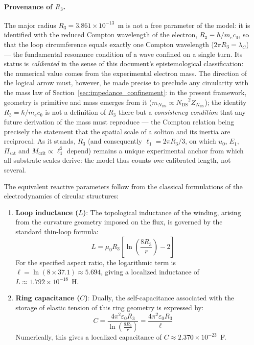 \documentclass[11pt,a4paper]{article}
\theoremstyle{plain}
\theoremstyle{remark}
\newcommand{\Ncd}{\ensuremath{N_{\mathrm{DS}}}}
\begin{document}
\paragraph{Provenance of $R_3$.}
The major radius $R_3 = 3.861\times10^{-13}$~m is not a free parameter of the model: it is identified with the reduced Compton wavelength of the electron, $R_3 \equiv \hbar/m_e c_0$, so that the loop circumference equals exactly one Compton wavelength ($2\pi R_3 = \lambda_C$) --- the fundamental resonance condition of a wave confined on a single turn. Its status is \emph{calibrated} in the sense of this document's epistemological classification: the numerical value comes from the experimental electron mass. The direction of the logical arrow must, however, be made precise to preclude any circularity with the mass law of Section~\ref{sec:impedance_confinement}: in the present framework, geometry is primitive and mass emerges from it ($m_{\Ncd} \propto \Ncd^2 Z_{\Ncd}$); the identity $R_3 = \hbar/m_e c_0$ is not a definition of $R_3$ there but a \emph{consistency condition} that any future derivation of the mass must reproduce --- the Compton relation being precisely the statement that the spatial scale of a soliton and its inertia are reciprocal. As it stands, $R_3$ (and consequently $\ell_1 = 2\pi R_3/3$, on which $u_0$, $E_1$, $\Pi_{\text{sat}}$ and $M_{\text{crit}} \propto \ell_1^2$ depend) remains a unique experimental anchor from which all substrate scales derive: the model thus counts \emph{one} calibrated length, not several.

The equivalent reactive parameters follow from the classical formulations of the electrodynamics of circular structures:

\begin{enumerate}
    \item \textbf{Loop inductance ($L$)}: The topological inductance of the winding, arising from the curvature geometry imposed on the flux, is governed by the standard thin-loop formula:
    \begin{equation}
    L = \mu_0 R_3 \left[ \ln\left(\frac{8R_3}{r}\right) - 2 \right]
    \end{equation}
    For the specified aspect ratio, the logarithmic term is $\ell = \ln(8 \times 37.1) \approx 5.694$, giving a localized inductance of $L \approx 1.792 \times 10^{-18}$~H.

    \item \textbf{Ring capacitance ($C$)}: Dually, the self-capacitance associated with the storage of elastic tension of this ring geometry is expressed by:
    \begin{equation}
    C = \frac{4\pi^2 \varepsilon_0 R_3}{\ln\left(\frac{8R_3}{r}\right)} = \frac{4\pi^2 \varepsilon_0 R_3}{\ell}
    \end{equation}
    Numerically, this gives a localized capacitance of $C \approx 2.370 \times 10^{-23}$~F.
\end{enumerate}
\end{document}
